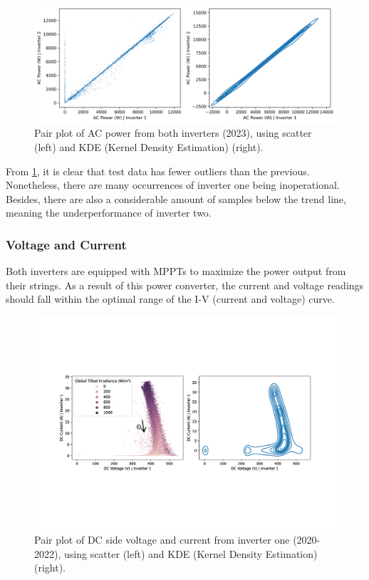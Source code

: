\begin{figure}[h!]
    \centering
    \includegraphics[width=\textwidth]{figures/chapter5/analysis/03_power_pairplots_test-1.png}
    \caption{Pair plot of AC power from both inverters (2023), using scatter (left) and KDE (Kernel Density Estimation) (right).}
    \label{fig:eda_power_test_pair}
\end{figure}

From \ref{fig:eda_power_test_pair}, it is clear that test data has fewer outliers than the previous. Nonetheless, there are many occurrences of inverter one being inoperational. Besides, there are also a considerable amount of samples below the trend line, meaning the underperformance of inverter two.

\subsubsection{Voltage and Current} \label{subsubsec:eda_volt_curr}

Both inverters are equipped with MPPTs to maximize the power output from their strings. As a result of this power converter, the current and voltage readings should fall within the optimal range of the I-V (current and voltage) curve.

\begin{figure}[h!]
    \centering
    \includegraphics[width=\textwidth,trim={0 5.5cm 0cm 5.5cm},clip]{figures/chapter5/analysis/04_voltage_current_pairplot_kb_1_annotated-1.png}
    \caption{Pair plot of DC side voltage and current from inverter one (2020-2022), using scatter (left) and KDE (Kernel Density Estimation) (right).}
    \label{fig:eda_volt_curr_pair_kb_1}
\end{figure}

